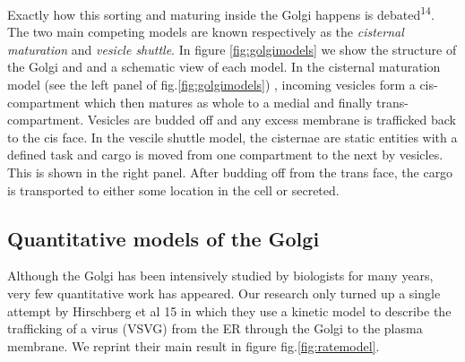 \documentclass[12pt,a4paper,]{Dissertate}
\begin{document}
Exactly how this sorting and maturing inside the Golgi happens is
debated\textsuperscript{14}. The two main competing models are known
respectively as the \emph{cisternal maturation} and \emph{vesicle
shuttle}. In figure \ref{fig:golgimodels} we show the structure of
the Golgi and and a schematic view of each model. In the cisternal
maturation model (see the left panel of fig.\ref{fig:golgimodels}) ,
incoming vesicles form a cis-compartment which then matures as whole to
a medial and finally trans-compartment. Vesicles are budded off and any
excess membrane is trafficked back to the cis face. In the vescile
shuttle model, the cisternae are static entities with a defined task and
cargo is moved from one compartment to the next by vesicles. This is
shown in the right panel. After budding off from the trans face, the
cargo is transported to either some location in the cell or secreted.

\hypertarget{quantitative-models-of-the-golgi}{%
\subsection{Quantitative models of the
Golgi}\label{quantitative-models-of-the-golgi}}

Although the Golgi has been intensively studied by biologists for many
years, very few quantitative work has appeared. Our research only turned
up a single attempt by Hirschberg et al 15 in which they use a kinetic
model to describe the trafficking of a virus (VSVG) from the ER through
the Golgi to the plasma membrane. We reprint their main result in figure
fig.\ref{fig:ratemodel}.
\end{document}

